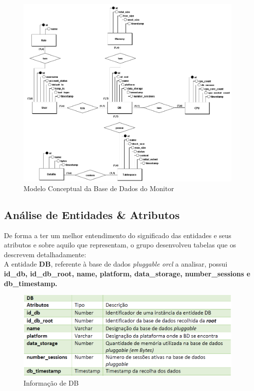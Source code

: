 \documentclass[a4paper]{article}
\begin{document}
\begin{figure}[H]
\centering
\includegraphics[scale=0.45]{modelo_conceptual.png}
\caption{Modelo Conceptual da Base de Dados do Monitor}
\end{figure}

\newpage

\subsection{Análise de Entidades \& Atributos}
De forma a ter um melhor entendimento do significado das entidades e seus atributos e sobre aquilo que representam, o grupo desenvolveu tabelas que os descrevem detalhadamente:\\

A entidade \textbf{DB}, referente à base de dados \emph{pluggable orcl} a analisar, possui \textbf{id\_db, id\_db\_root, name, platform, data\_storage, number\_sessions e db\_timestamp.}

\begin{figure}[H]
\centering
\includegraphics[scale=0.65]{db.PNG}
\caption{Informação de DB}
\end{figure}
\end{document}
